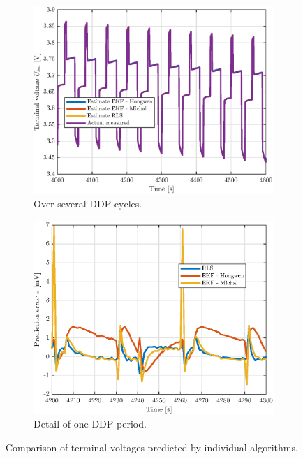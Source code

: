 \begin{figure}[hbp]
    \centering
\begin{subfigure}{0.49\textwidth}
    \centering
    \includegraphics[width=\textwidth]{figures/10/voltages.eps}
    \caption{Over several DDP cycles.}
    \label{fig:10-voltages}
    \end{subfigure}
    \hfill
    \begin{subfigure}{0.49\textwidth}
    \centering
    \includegraphics[width=\textwidth]{figures/10/voltages-pred-error.eps}
    \caption{Detail of one DDP period.}
    \label{fig:10-pred-error}
    \end{subfigure}
    
    \caption{Comparison of terminal voltages predicted by individual algorithms.}
    \label{fig:10-pred}
\end{figure}




